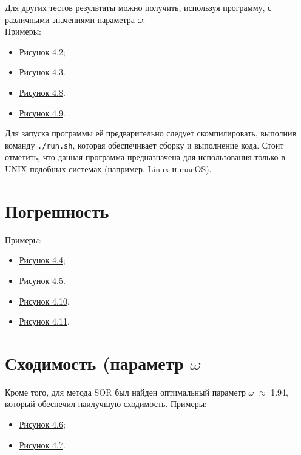\documentclass[a4paper, fleqn]{report}
\begin{document}
Для других тестов результаты можно получить, используя программу, с различными значениями параметра \(\omega\). \\
Примеры:
\begin{itemize}
    \item \hyperref[fig:jacobi_1_1]{Рисунок 4.2};
    \item \hyperref[fig:jacobi_1_1000000]{Рисунок 4.3}.
    \item \hyperref[fig:best_res_1_1]{Рисунок 4.8}.
    \item \hyperref[fig:best_res_1_1000000]{Рисунок 4.9}.
\end{itemize}
\vspace{0.25cm}

Для запуска программы её предварительно следует скомпилировать, выполнив команду \texttt{./run.sh}, которая обеспечивает сборку и выполнение кода.
Стоит отметить, что данная программа предназначена для использования только в UNIX-подобных системах (например, Linux и macOS).
\newpage

\section*{Погрешность}
Примеры:
\begin{itemize}
    \item \hyperref[fig:dif_jacobi_1_1]{Рисунок 4.4};
    \item \hyperref[fig:dif_jacobi_1_1000000]{Рисунок 4.5}.
    \item \hyperref[fig:best_dif_1_1]{Рисунок 4.10}.
    \item \hyperref[fig:best_dif_1_1000000]{Рисунок 4.11}.
\end{itemize}

\section*{Сходимость (параметр \(\omega\)}
Кроме того, для метода SOR был найден оптимальный параметр \(\omega\) \(\approx\) 1.94, который обеспечил наилучшую сходимость.
Примеры:
\begin{itemize}
    \item \hyperref[fig:best_w_1_1]{Рисунок 4.6};
    \item \hyperref[fig:best_w_1_1000000]{Рисунок 4.7}.
\end{itemize}
\vspace{1cm}
\end{document}
